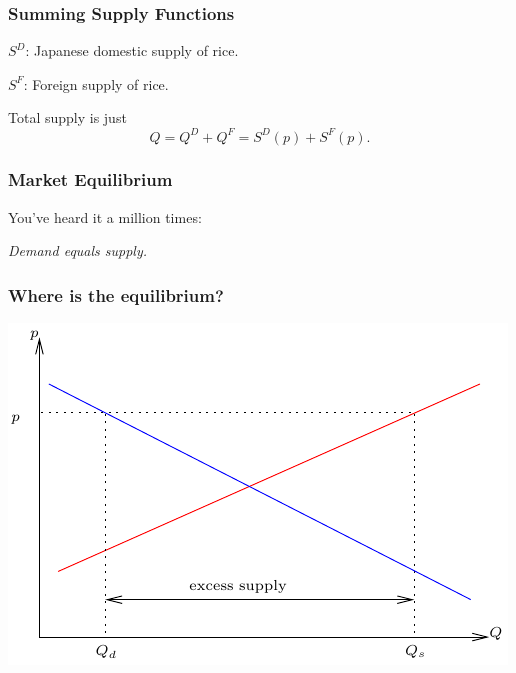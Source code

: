 \documentclass[xcolor=pdftex,dvipsnames]{beamer}
\begin{document}
\begin{frame}
\frametitle{Summing Supply Functions}
$S^D$: Japanese domestic supply of rice.\bigskip

$S^F$: Foreign supply of rice.

Total supply is just
\[
Q=Q^D + Q^F = S^D(p)+S^F(p).
\]

\end{frame}


\begin{frame}
\frametitle{Market Equilibrium}
You've heard it a million times:
\begin{center}
\emph{\color{red} Demand equals supply.}
\end{center}\bigskip

\end{frame}

\begin{frame}
\frametitle{Where is the equilibrium?}
\begin{center}
\includegraphics{pics/Equilibrium0}
\end{center}
\end{frame}
\end{document}
